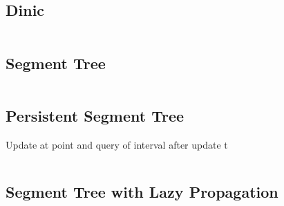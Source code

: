 \documentclass{article}
\begin{document}
\subsection{Dinic}
\inputminted[obeytabs=true,tabsize=4]{cpp}{code/dinic.cpp}
\subsection{Segment Tree} 
\inputminted[obeytabs=true,tabsize=4]{cpp}{code/seg.cpp}
\subsection{Persistent Segment Tree} 
Update at point and query of interval after update t
\inputminted[obeytabs=true,tabsize=4]{cpp}{code/persistentseg.cpp}
\subsection{Segment Tree with Lazy Propagation} 
\inputminted[obeytabs=true,tabsize=4]{cpp}{code/lazyseg.cpp}
\end{document}
